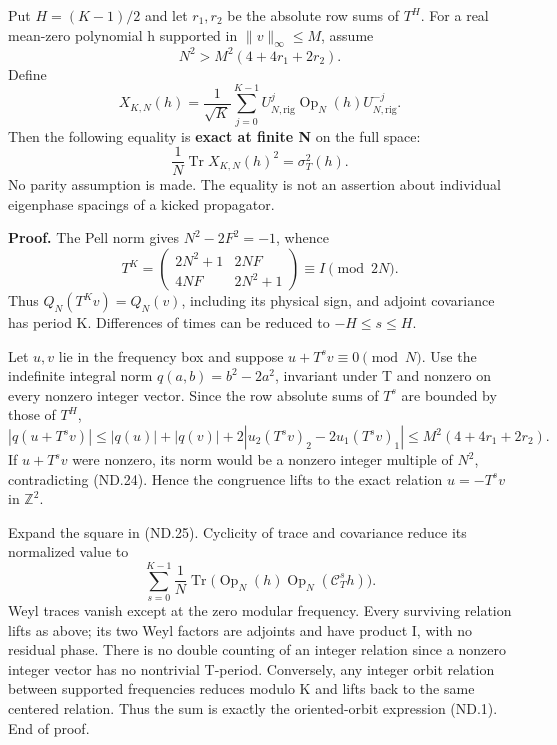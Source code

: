 Put \(H=(K-1)/2\) and let \(r_1,r_2\) be the absolute row sums of \(T^H\). For a real mean-zero polynomial h supported in \(\|v\|_\infty\leq M\), assume \[
                    N^2>M^2(4+4r_1+2r_2).                  \tag{ND.24}
\] Define \[
 X_{K,N}(h)=\frac1{\sqrt K}\sum_{j=0}^{K-1}
                    U_{N,\mathrm{rig}}^j\operatorname{Op}_N(h)U_{N,\mathrm{rig}}^{-j}.
\] Then the following equality is \textbf{exact at finite N} on the full space: \[
             \boxed{\frac1N\operatorname{Tr}X_{K,N}(h)^2
                                  =\sigma_T^2(h).}          \tag{ND.25}
\] No parity assumption is made. The equality is not an assertion about individual eigenphase spacings of a kicked propagator.

\textbf{Proof.} The Pell norm gives \(N^2-2F^2=-1\), whence \[
 T^K=\begin{pmatrix}2N^2+1&2NF\\4NF&2N^2+1\end{pmatrix}
                           \equiv I\pmod{2N}.               \tag{ND.26}
\] Thus \(Q_N(T^Kv)=Q_N(v)\), including its physical sign, and adjoint covariance has period K. Differences of times can be reduced to \(-H\leq s\leq H\).

Let \(u,v\) lie in the frequency box and suppose \(u+T^sv\equiv0\pmod N\). Use the indefinite integral norm \(q(a,b)=b^2-2a^2\), invariant under T and nonzero on every nonzero integer vector. Since the row absolute sums of \(T^s\) are bounded by those of \(T^H\), \[
 |q(u+T^sv)|
 \leq |q(u)|+|q(v)|+2|u_2(T^sv)_2-2u_1(T^sv)_1|
 \leq M^2(4+4r_1+2r_2).
\] If \(u+T^sv\) were nonzero, its norm would be a nonzero integer multiple of \(N^2\), contradicting (ND.24). Hence the congruence lifts to the exact relation \(u=-T^sv\) in \(\mathbb Z^2\).

Expand the square in (ND.25). Cyclicity of trace and covariance reduce its normalized value to \[
 \sum_{s=0}^{K-1}\frac1N\operatorname{Tr}
        \bigl(\operatorname{Op}_N(h)\operatorname{Op}_N(\mathcal C_T^s h)\bigr).
\] Weyl traces vanish except at the zero modular frequency. Every surviving relation lifts as above; its two Weyl factors are adjoints and have product I, with no residual phase. There is no double counting of an integer relation since a nonzero integer vector has no nontrivial T-period. Conversely, any integer orbit relation between supported frequencies reduces modulo K and lifts back to the same centered relation. Thus the sum is exactly the oriented-orbit expression (ND.1). End of proof.

